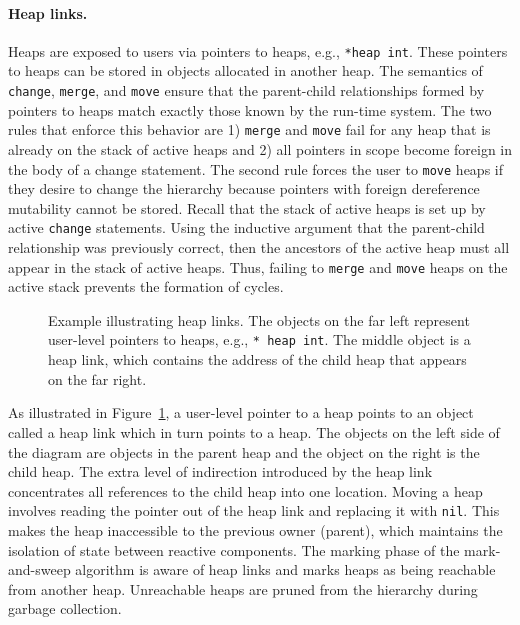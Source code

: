\paragraph{Heap links.}
Heaps are exposed to users via pointers to heaps, e.g., \verb+*heap int+.
These pointers to heaps can be stored in objects allocated in another heap.
The semantics of \verb+change+, \verb+merge+, and \verb+move+ ensure that the parent-child relationships formed by pointers to heaps match exactly those known by the run-time system.
The two rules that enforce this behavior are 1) \verb+merge+ and \verb+move+ fail for any heap that is already on the stack of active heaps and 2) all pointers in scope become foreign in the body of a change statement.
The second rule forces the user to \verb+move+ heaps if they desire to change the hierarchy because pointers with foreign dereference mutability cannot be stored.
Recall that the stack of active heaps is set up by active \verb+change+ statements.
Using the inductive argument that the parent-child relationship was previously correct, then the ancestors of the active heap must all appear in the stack of active heaps.
Thus, failing to \verb+merge+ and \verb+move+ heaps on the active stack prevents the formation of cycles.

\begin{figure}
\centering
\cprotect\caption{Example illustrating heap links\label{heap_link}.  The objects on the far left represent user-level pointers to heaps, e.g., \verb+* heap int+.  The middle object is a heap link, which contains the address of the child heap that appears on the far right.}
\end{figure}

As illustrated in Figure~\ref{heap_link}, a user-level pointer to a heap points to an object called a heap link which in turn points to a heap.
The objects on the left side of the diagram are objects in the parent heap and the object on the right is the child heap.
The extra level of indirection introduced by the heap link concentrates all references to the child heap into one location.
Moving a heap involves reading the pointer out of the heap link and replacing it with \verb+nil+.
This makes the heap inaccessible to the previous owner (parent), which maintains the isolation of state between reactive components.
The marking phase of the mark-and-sweep algorithm is aware of heap links and marks heaps as being reachable from another heap.
Unreachable heaps are pruned from the hierarchy during garbage collection.

